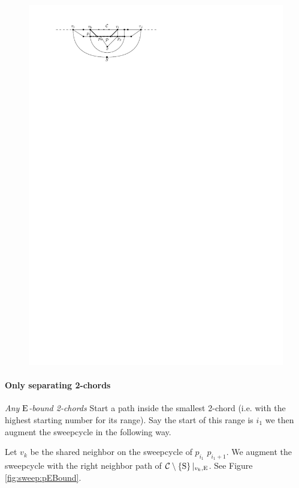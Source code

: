     \begin{figure}[h]
      \centering
      \includegraphics[scale=1]{unifiedAlgo/img/sweep/2chordInChordUpdate}
      \caption{}
      \label{fig:sweep:2chordInChordUpdate}
    \end{figure}

    \paragraph{Only separating 2-chords}
    \emph{Any $\mathrm{E}$-bound 2-chords}
    Start a path inside the smallest 2-chord (i.e. with the highest starting number for its range). Say the start of this range is $i_1$ we then augment the sweepcycle in the following way.

    Let $v_k$ be the shared neighbor on the sweepcycle of $p_{i_1}$ $p_{i_1 +1}$. We augment the sweepcycle with the right neighbor path of $\mathcal{C} \setminus \left\lbrace {\mathrm{S}} \right\rbrace|_{v_k, \mathrm{E}}$. See Figure \ref{fig:sweep:pEBound}.

